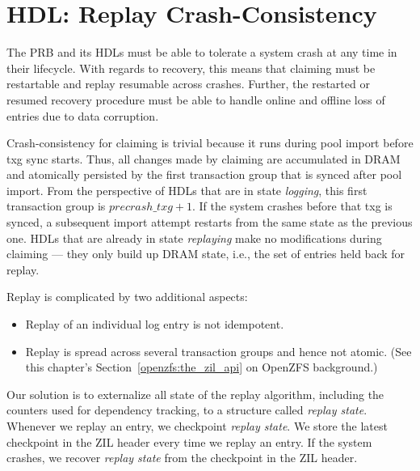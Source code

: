 \documentclass[12pt,a4paper,twoside]{book}
\begin{document}
\section{HDL: Replay Crash-Consistency}\label{di:prb:ccrecovery}

The PRB and its HDLs must be able to tolerate a system crash at any time in their lifecycle.
With regards to recovery, this means that claiming must be restartable and replay resumable across crashes.
Further, the restarted or resumed recovery procedure must be able to handle online and offline loss of entries due to data corruption.

Crash-consistency for claiming is trivial because it runs during pool import before txg sync starts.
Thus, all changes made by claiming are accumulated in DRAM and atomically persisted by the first transaction group that is synced after pool import.
From the perspective of HDLs that are in state \textit{logging}, this first transaction group is $precrash\_txg + 1$.
If the system crashes before that txg is synced, a subsequent import attempt restarts from the same state as the previous one.
HDLs that are already in state \textit{replaying} make no modifications during claiming --- they only build up DRAM state, i.e., the set of entries held back for replay.

Replay is complicated by two additional aspects:
\begin{itemize}[noitemsep]
    \item Replay of an individual log entry is not idempotent.
    \item Replay is spread across several transaction groups and hence not atomic.
        (See this chapter's Section~\ref{openzfs:the_zil_api} on OpenZFS background.)
\end{itemize}
Our solution is to externalize all state of the replay algorithm, including the counters used for dependency tracking, to a structure called \textit{replay state}.
Whenever we replay an entry, we checkpoint \textit{replay state}.
We store the latest checkpoint in the ZIL header every time we replay an entry.
If the system crashes, we recover \textit{replay state} from the checkpoint in the ZIL header.
\end{document}
